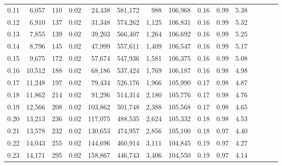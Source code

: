 \begin{tabular}{rrrcrrrrrrrrrrr}
0.11 &   6,057 &    110 &                                       0.02 &   24,438 &  581,172 &      988 &  106,968 &  0.16 &  0.99 &                         5.38 \\
0.12 &   6,910 &    137 &                                       0.02 &   31,348 &  574,262 &    1,125 &  106,831 &  0.16 &  0.99 &                         5.32 \\
0.13 &   7,855 &    139 &                                       0.02 &   39,203 &  566,407 &    1,264 &  106,692 &  0.16 &  0.99 &                         5.25 \\
0.14 &   8,796 &    145 &                                       0.02 &   47,999 &  557,611 &    1,409 &  106,547 &  0.16 &  0.99 &                         5.17 \\
0.15 &   9,675 &    172 &                                       0.02 &   57,674 &  547,936 &    1,581 &  106,375 &  0.16 &  0.99 &                         5.08 \\
0.16 &  10,512 &    188 &                                       0.02 &   68,186 &  537,424 &    1,769 &  106,187 &  0.16 &  0.98 &                         4.98 \\
0.17 &  11,248 &    197 &                                       0.02 &   79,434 &  526,176 &    1,966 &  105,990 &  0.17 &  0.98 &                         4.87 \\
0.18 &  11,862 &    214 &                                       0.02 &   91,296 &  514,314 &    2,180 &  105,776 &  0.17 &  0.98 &                         4.76 \\
0.19 &  12,566 &    208 &                                       0.02 &  103,862 &  501,748 &    2,388 &  105,568 &  0.17 &  0.98 &                         4.65 \\
0.20 &  13,213 &    236 &                                       0.02 &  117,075 &  488,535 &    2,624 &  105,332 &  0.18 &  0.98 &                         4.53 \\
0.21 &  13,578 &    232 &                                       0.02 &  130,653 &  474,957 &    2,856 &  105,100 &  0.18 &  0.97 &                         4.40 \\
0.22 &  14,043 &    255 &                                       0.02 &  144,696 &  460,914 &    3,111 &  104,845 &  0.19 &  0.97 &                         4.27 \\
0.23 &  14,171 &    295 &                                       0.02 &  158,867 &  446,743 &    3,406 &  104,550 &  0.19 &  0.97 &                         4.14 \\

\end{tabular}
